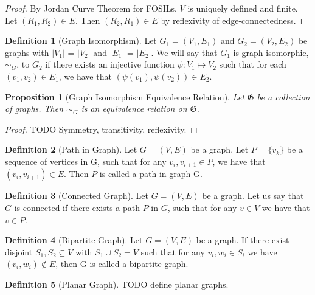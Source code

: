 \documentclass{article}
\theoremstyle{definition}
\newtheorem{definition}{Definition}
\theoremstyle{definition}
\theoremstyle{plain}
\newtheorem{proposition}{Proposition}
\begin{document}
\begin{proof}
By Jordan Curve Theorem for FOSILs, $V$ is uniquely defined and finite. Let $(R_{1}, R_{2}) \in E$. Then $(R_{2}, R_{1}) \in E$ by reflexivity of edge-connectedness.
\end{proof}

\begin{definition}[Graph Isomorphism]
Let $G_{1}=(V_{1}, E_{1})$ and $G_{2}=(V_{2}, E_{2})$ be graphs with $\lvert V_{1} \rvert$ = $\lvert V_{2} \rvert$ and $\lvert E_{1} \rvert$ = $\lvert E_{2} \rvert$. We will say that $G_{1}$ is graph isomorphic, $\sim_{G}$, to $G_{2}$ if there exists an injective function $\psi : V_{1} \mapsto V_{2}$ such that for each $(v_{1}, v_{2}) \in E_{1}$, we have that $(\psi(v_{1}), \psi(v_{2})) \in E_{2}$.
\end{definition}

\begin{proposition}[Graph Isomorphism Equivalence Relation]
Let $\mathfrak{G}$ be a collection of graphs. Then $\sim_{G}$ is an equivalence relation on $\mathfrak{G}$.
\end{proposition}
\begin{proof}
TODO Symmetry, transitivity, reflexivity.
\end{proof}

\begin{definition}[Path in Graph]
Let $G=(V, E)$ be a graph. Let $P=\{v_{k}\}$ be a sequence of vertices in G, such that for any $v_{i}, v_{i+1} \in P$, we have that $(v_{i}, v_{i+1}) \in E$. Then $P$ is called a path in graph G.
\end{definition}

\begin{definition}[Connected Graph]
Let $G=(V, E)$ be a graph. Let us say that $G$ is connected if there exists a path $P$ in $G$, such that for any $v \in V$ we have that $v \in P$.
\end{definition}

\begin{definition}[Bipartite Graph]
Let $G=(V,E)$ be a graph. If there exist disjoint $S_{1}, S_{2} \subseteq V$ with $S_{1} \cup S_{2} = V$ such that for any $v_{i}, w_{i} \in S_{i}$ we have $(v_{i}, w_{i}) \notin E$, then G is called a bipartite graph.
\end{definition}

\begin{definition}[Planar Graph]
TODO define planar graphs.
\end{definition}
\end{document}
